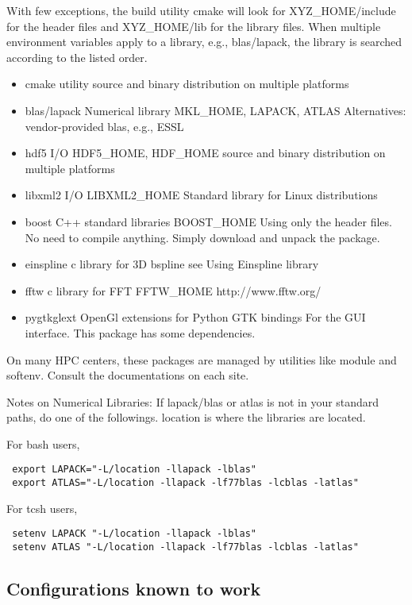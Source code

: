 With few exceptions, the build utility cmake will look for XYZ\_HOME/include for the header files and XYZ\_HOME/lib for the library files. When multiple environment variables apply to a library, e.g., blas/lapack, the library is searched according to the listed order. 
\begin{itemize}
\item{} cmake   utility                 source and binary distribution on multiple platforms
\item{} blas/lapack     Numerical library       MKL\_HOME, LAPACK, ATLAS         Alternatives: vendor-provided blas, e.g., ESSL
\item{} hdf5    I/O     HDF5\_HOME, HDF\_HOME     source and binary distribution on multiple platforms
\item{} libxml2         I/O     LIBXML2\_HOME    Standard library for Linux distributions
\item{} boost   C++ standard libraries  BOOST\_HOME      Using only the header files. No need to compile anything. Simply download and unpack the package.
\item{} einspline       c library for 3D bspline        see Using Einspline library     
\item{} fftw    c library for FFT       FFTW\_HOME       http://www.fftw.org/
\item{} pygtkglext      OpenGl extensions for Python GTK bindings               For the GUI interface. This package has some dependencies.
\end{itemize}

On many HPC centers, these packages are managed by utilities like module and softenv. Consult the documentations on each site.

Notes on Numerical Libraries: If lapack/blas or atlas is not in your standard paths, do one of the followings. location is where the libraries are located.

For bash users,
\begin{verbatim}
 export LAPACK="-L/location -llapack -lblas"
 export ATLAS="-L/location -llapack -lf77blas -lcblas -latlas" 
\end{verbatim}
For tcsh users,
\begin{verbatim}
 setenv LAPACK "-L/location -llapack -lblas"
 setenv ATLAS "-L/location -llapack -lf77blas -lcblas -latlas"
\end{verbatim}

\subsection{Configurations known to work}
